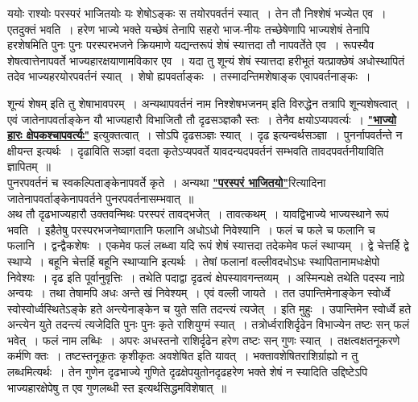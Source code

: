 \documentclass[11pt, openany]{book}
\begin{document}
 ययोः राश्योः परस्परं भाजितयोः यः शेषोऽङ्कः स तयोरपवर्तनं 
स्यात्~। तेन तौ निश्शेषं भज्येत एव~। एतदुक्तं भवति~। हरेण भाज्ये 
भक्ते यच्छेषं तेनापि सहरो भाज-नीयः तच्छेषेणापि भाज्यशेषं तेनापि 
हरशेषमिति पुनः पुनः परस्परभजने क्रियमाणे यद्यन्तरूपं शेषं स्यात्तदा तौ
नापवर्तेते एव~। रूपस्यैव शेषत्वात्तेनापवर्ते भाज्यहारक्षयाणामविकार एव~।
यदा तु शून्यं शेषं स्यात्तदा हरीभूतं यत्प्राक्छेषं अधोस्थापितं तदेव
भाज्यहरयोरपवर्तनं स्यात्~। शेषो ह्यपवर्ताङ्कः~। तस्मादन्तिमशेषाङ्क एवापवर्तनाङ्कः~।
\newpage

\noindent शून्यं शेषम् इति तु शेषाभावपरम्~। अन्यथापवर्तनं नाम निश्शेषभजनम् इति विरुद्धेन तत्रापि शून्यशेषत्वात्~। एवं जातेनापवर्ताङ्केन यौ भाज्यहारौ विभाजितौ तौ दृढसञ्ज्ञकौ स्तः~। तेनैव क्षयोऽप्यपवर्त्यः~। \hyperref[25]{\textbf{"भाज्यो हारः क्षेपकश्चापवर्त्यः"}} इत्युक्तत्वात्~। सोऽपि दृढसञ्ज्ञः स्यात्~। दृढ इत्यन्वर्थसञ्ज्ञा~। पुनर्नापवर्तन्ते न क्षीयन्त इत्यर्थः~। दृढाविति सञ्ज्ञां वदता कृतेऽप्यपवर्ते यावदन्यदपवर्तनं सम्भवति तावदपवर्तनीयाविति ज्ञापितम्~॥ \\

\vspace{-3mm}
 पुनरपवर्तनं च स्वकल्पिताङ्केनापवर्ते कृते~। अन्यथा \hyperref[26]{\textbf{"परस्परं भाजितयो"}}रित्यादिना जातेनापवर्ताङ्केनापवर्तने पुनरपवर्तनासम्भवात्~॥ \\

\vspace{-3mm}
 अथ तौ दृढभाज्यहारौ उक्तवन्मिथः परस्परं तावद्भजेत्~। तावत्कथम्~। 
यावद्विभाज्ये भाज्यस्थाने रूपं भवति~। इहैतेषु परस्परभजनेष्वागतानि 
फलानि अधोऽधो निवेश्यानि~। फलं च फले च फलानि च फलानि~। 
द्वन्द्वैकशेषः~। एकमेव फलं लब्ध्वा यदि रूपं शेषं स्यात्तदा तदेकमेव 
फलं स्थाप्यम्~। द्वे चेत्तर्हि द्वे स्थाप्ये~। बहूनि चेत्तर्हि बहूनि
स्थाप्यानि इत्यर्थः~। तेषां फलानां वल्लीवदधोऽधः स्थापितानामधःक्षेपो निवेश्यः~। दृढ
इति पूर्वानुवृत्तिः~। तथेति पदाद्वा दृढत्वं क्षेपस्यावगन्तव्यम्~।
अस्मिन्पक्षे तथेति पदस्य नाग्रे अन्वयः~। तथा तेषामपि अधः अन्ते खं निवेश्यम्~। एवं वल्ली जायते~। तत उपान्तिमेनाङ्केन स्वोर्ध्वे स्वोस्वोर्ध्वस्थितेऽङ्के हते
अन्त्येनाङ्केन च युते सति तदन्त्यं त्यजेत्~। इति मुहुः~। उपान्तिमेन स्वोर्ध्वे हते अन्त्येन युते तदन्त्यं त्यजेदिति पुनः पुनः कृते राशियुग्मं स्यात्~। तत्रोर्ध्वराशिर्दृढेन विभाज्येन तष्टः सन् फलं भवेत्~। फलं नाम लब्धिः~। अपरः अधस्तनो राशिर्दृढेन हरेण तष्टः सन् गुणः स्यात्~। तक्षत्वक्षतनूकरणे कर्मणि क्तः~। तष्टस्तनूकृतः कृशीकृतः अवशेषित इति यावत्~। भक्तावशेषितराशिर्ग्राह्यो न तु लब्धमित्यर्थः~। तेन गुणेन दृढभाज्ये गुणिते दृढक्षेपयुतोनदृढहरेण भक्ते शेषं न स्यादिति उद्दिष्टेऽपि भाज्यहारक्षेपेषु त एव गुणलब्धी स्त इत्यर्थसिद्धमविशेषात्~॥
\end{document}
